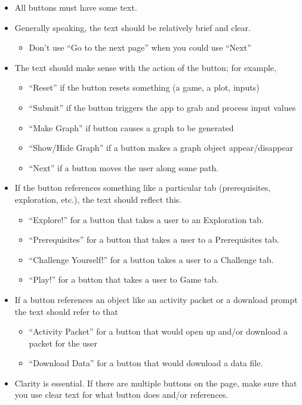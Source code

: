 \documentclass[
]{book}
\providecommand{\tightlist}{%
  \setlength{\itemsep}{0pt}\setlength{\parskip}{0pt}}
\begin{document}
\begin{itemize}
\tightlist
\item
  All buttons must have some text.
\item
  Generally speaking, the text should be relatively brief and clear.

  \begin{itemize}
  \tightlist
  \item
    Don't use ``Go to the next page'' when you could use ``Next''
  \end{itemize}
\item
  The text should make sense with the action of the button; for example,

  \begin{itemize}
  \tightlist
  \item
    ``Reset'' if the button resets something (a game, a plot, inputs)
  \item
    ``Submit'' if the button triggers the app to grab and process input values
  \item
    ``Make Graph'' if button causes a graph to be generated
  \item
    ``Show/Hide Graph'' if a button makes a graph object appear/disappear
  \item
    ``Next'' if a button moves the user along some path.
  \end{itemize}
\item
  If the button references something like a particular tab (prerequisites, exploration, etc.), the text should reflect this.

  \begin{itemize}
  \tightlist
  \item
    ``Explore!'' for a button that takes a user to an Exploration tab.
  \item
    ``Prerequisites'' for a button that takes a user to a Prerequisites tab.
  \item
    ``Challenge Yourself!'' for a button takes a user to a Challenge tab.
  \item
    ``Play!'' for a button that takes a user to Game tab.
  \end{itemize}
\item
  If a button references an object like an activity packet or a download prompt the text should refer to that

  \begin{itemize}
  \tightlist
  \item
    ``Activity Packet'' for a button that would open up and/or download a packet for the user
  \item
    ``Download Data'' for a button that would download a data file.
  \end{itemize}
\item
  Clarity is essential. If there are multiple buttons on the page, make sure that you use clear text for what button does and/or references.
\end{itemize}
\end{document}

